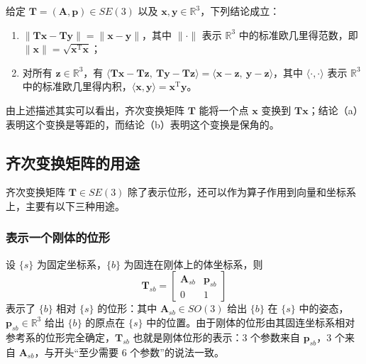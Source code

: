 给定 $\boldsymbol{T}=(\boldsymbol{A},\boldsymbol{p})\in SE(3)$ 以及 $\boldsymbol{x},\boldsymbol{y}\in\mathbb{R}^{3}$，下列结论成立：
\begin{enumerate}
	\item[(a)] $\|\boldsymbol{T}\boldsymbol{x}-\boldsymbol{T}\boldsymbol{y}\|=\|\boldsymbol{x}-\boldsymbol{y}\|$，其中 $\|\cdot\|$ 表示 $\mathbb{R}^{3}$ 中的标准欧几里得范数，即 $\|\boldsymbol{x}\|=\sqrt{\boldsymbol{x}^{\mathrm{T}}\boldsymbol{x}}$；
	\item[(b)] 对所有 $\boldsymbol{z}\in\mathbb{R}^{3}$，有 $\langle\boldsymbol{T}\boldsymbol{x}-\boldsymbol{T}\boldsymbol{z},\ \boldsymbol{T}\boldsymbol{y}-\boldsymbol{T}\boldsymbol{z}\rangle=\langle\boldsymbol{x}-\boldsymbol{z},\ \boldsymbol{y}-\boldsymbol{z}\rangle$，其中 $\langle\cdot,\cdot\rangle$ 表示 $\mathbb{R}^{3}$ 中的标准欧几里得内积，$\langle\boldsymbol{x},\boldsymbol{y}\rangle=\boldsymbol{x}^{\mathrm{T}}\boldsymbol{y}$。
\end{enumerate}

由上述描述其实可以看出，齐次变换矩阵 $\boldsymbol{T}$ 能将一个点 $\boldsymbol{x}$ 变换到 $\boldsymbol{T}\boldsymbol{x}$；结论（a）表明这个变换是等距的，而结论（b）表明这个变换是保角的。

\subsection{齐次变换矩阵的用途}

齐次变换矩阵 $\boldsymbol{T}\in SE(3)$ 除了表示位形，还可以作为算子作用到向量和坐标系上，主要有以下三种用途。

\subsubsection{表示一个刚体的位形}

设 $\{s\}$ 为固定坐标系，$\{b\}$ 为固连在刚体上的体坐标系，则
\begin{equation}
	\label{eq:用途:位形}
	\boldsymbol{T}_{sb}=\begin{bmatrix}
		\boldsymbol{A}_{sb} & \boldsymbol{p}_{sb}\\
		0 & 1
	\end{bmatrix}
\end{equation}
表示了 $\{b\}$ 相对 $\{s\}$ 的位形：其中 $\boldsymbol{A}_{sb}\in SO(3)$ 给出 $\{b\}$ 在 $\{s\}$ 中的姿态，$\boldsymbol{p}_{sb}\in\mathbb{R}^{3}$ 给出 $\{b\}$ 的原点在 $\{s\}$ 中的位置。由于刚体的位形由其固连坐标系相对参考系的位形完全确定，$\boldsymbol{T}_{sb}$ 也就是刚体位形的表示：3 个参数来自 $\boldsymbol{p}_{sb}$，3 个来自 $\boldsymbol{A}_{sb}$，与开头“至少需要 6 个参数”的说法一致。

